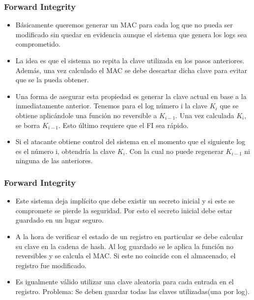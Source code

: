 \documentclass[10pt, a4paper,english,spanish]{beamer}
\begin{document}
\begin{frame}
\frametitle{Forward Integrity}
\begin{itemize}
\item Básicamente queremos generar un MAC para cada log que no pueda ser modificado sin quedar en evidencia
aunque el sistema que genera los logs sea comprometido.
\item La idea es que el sistema no repita la clave utilizada en los pasos anteriores. Además, una vez calculado
el MAC se debe descartar dicha clave para evitar que se la pueda obtener.
\item Una forma de asegurar esta propiedad es generar la clave actual en base a la inmediatamente anterior.
Tenemos para el log número i la clave $K_{i}$ que se obtiene aplicándole una función no reversible a
$K_{i-1}$. Una vez calculada $K_{i}$, se borra $K_{i-1}$. Esto último requiere que el FI sea rápido.
\item Si el atacante obtiene control del sistema en el momento que el siguiente log es el número i,
obtendría la clave $K_{i}$. Con la cual no puede regenerar $K_{i-1}$ ni ninguna de las anteriores.
\end{itemize}
\end{frame}


\begin{frame}
\frametitle{Forward Integrity}
\begin{itemize}
\item Este sistema deja implícito que debe existir un secreto inicial y si este se compromete se pierde la
seguridad. Por esto el secreto inicial debe estar guardado en un lugar seguro.
\item A la hora de verificar el estado de un registro en particular se debe calcular su clave en la cadena de hash.
Al log guardado se le aplica la función no reversibles y se calcula el MAC. Si este no coincide con el almacenado,
el registro fue modificado.
\item Es igualmente válido utilizar una clave aleatoria para cada entrada en el registro. Problema:
Se deben guardar todas las claves utilizadas(una por log).

\end{itemize}
\end{frame}
\end{document}
